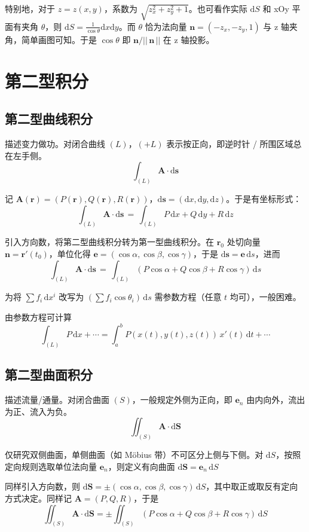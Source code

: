 \documentclass[12pt, a4paper, UTF8, openany]{ctexbook}
\newcommand{\dif}{\mathrm{d}}
\newcommand{\sdif}{\,\dif}
\newcommand{\mat}[1]{\mathbf{#1}}
\newcommand{\len}[1]{||\, #1 \,||}%
\begin{document}
        {\heiti 特别地}，对于 $z = z(x, y)$，系数为 $\sqrt{z_x^2 + z_y^2 + 1}$。也可看作实际 $\dif S$ 和 xOy 平面有夹角 $\theta$，则 $\dif S = \frac{1}{\cos \theta} \dif x \dif y$。而 $\theta$ 恰为法向量 $\mat{n} = (-z_x, -z_y, 1)$ 与 z 轴夹角，简单画图可知。于是 $\cos\theta$ 即 $\mat{n}/\len{\mat{n}}$ 在 z 轴投影。

    \section{第二型积分}
        \subsection{第二型曲线积分}
        描述变力做功。对闭合曲线 $(L)$，$(+L)$ 表示按正向，即逆时针 / 所围区域总在左手侧。
        $$\int_{(L)} \mat{A} \cdot \mat{\dif s}$$
        
        记 $\mat{A}(\mat{r}) = (P(\mat{r}), Q(\mat{r}), R(\mat{r}))$，$\mat{\dif s} = (\dif x, \dif y, \dif z)$。于是有坐标形式：
        $$\int_{(L)} \mat{A} \cdot \mat{\dif s} \,=\, \int_{(L)} P\sdif x + Q\sdif y + R\sdif z$$

        引入方向数，将第二型曲线积分转为第一型曲线积分。在 $\mat{r}_0$ 处切向量 $\mat{n} = \mat{r}'(t_0)$，单位化得 $\mat{e} = (\cos\alpha, \cos\beta, \cos\gamma)$，于是 $\mat{\dif s} = \mat{e} \sdif s$，进而
        $$\int_{(L)} \mat{A} \cdot \mat{\dif s} \,=\, \int_{(L)} (P\cos\alpha + Q\cos\beta + R\cos\gamma) \sdif s$$

        为将 $\sum f_i \sdif x^i$ 改写为 $(\sum f_i \cos\theta_i) \sdif s$ 需参数方程（任意 $t$ 均可），一般困难。

        由参数方程可计算
        $$\int_{(L)} P \sdif x + \cdots = \int_{a}^{b} P(x(t), y(t), z(t)) \, x'(t) \sdif t + \cdots$$

        \subsection{第二型曲面积分}
        描述流量/通量。对闭合曲面 $(S)$，一般规定外侧为正向，即 $\mat{e}_n$ 由内向外，流出为正、流入为负。
        $$\iint_{(S)} \mat{A} \cdot \mat{\dif S}$$
        
        仅研究双侧曲面，单侧曲面（如 Möbius 带）不可区分上侧与下侧。对 $\dif S$，按照定向规则选取单位法向量 $\mat{e}_n$，则定义有向曲面 $\mat{\dif S} = \mat{e}_n \sdif S$

        同样引入方向数，则 $\mat{\dif S} = \pm(\cos\alpha, \cos\beta, \cos\gamma)\sdif S$，其中取正或取反有定向方式决定。同样记 $\mat{A} = (P, Q, R)$，于是
        $$\iint_{(S)} \mat{A} \cdot \mat{\dif S} = \pm\iint_{(S)} (P\cos\alpha + Q\cos\beta + R\cos\gamma) \sdif S$$
\end{document}
